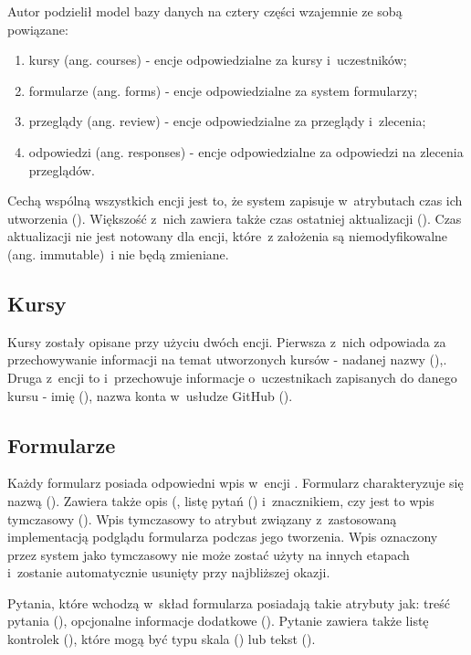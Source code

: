 Autor podzielił model bazy danych na cztery części wzajemnie ze sobą powiązane:
\begin{enumerate}
    \item kursy (ang. courses) - encje odpowiedzialne za kursy i~uczestników;
    \item formularze (ang. forms) - encje odpowiedzialne za system formularzy;
    \item przeglądy (ang. review) - encje odpowiedzialne za przeglądy i~zlecenia;
    \item odpowiedzi (ang. responses) - encje odpowiedzialne za odpowiedzi na zlecenia przeglądów.
\end{enumerate}

\medskip
Cechą wspólną wszystkich encji jest to, że system zapisuje w~atrybutach czas ich utworzenia (). Większość z~nich zawiera także czas ostatniej aktualizacji (). Czas aktualizacji nie jest notowany dla encji, które~z założenia są niemodyfikowalne (ang. immutable)~i nie będą zmieniane.

\subsection{Kursy}
Kursy zostały opisane przy użyciu dwóch encji. Pierwsza z~nich  odpowiada za przechowywanie informacji na temat utworzonych kursów - nadanej nazwy (),. Druga z~encji to  i~przechowuje informacje o~uczestnikach zapisanych do danego kursu - imię (), nazwa konta w~usłudze GitHub ().

\subsection{Formularze}
Każdy formularz posiada odpowiedni wpis w~encji . Formularz charakteryzuje się nazwą (). Zawiera także opis (, listę pytań () i~znacznikiem, czy jest to wpis tymczasowy (). Wpis tymczasowy to atrybut związany z~zastosowaną implementacją podglądu formularza podczas jego tworzenia. Wpis oznaczony przez system jako tymczasowy nie może zostać użyty na innych etapach i~zostanie automatycznie usunięty przy najbliższej okazji.

\medskip
Pytania, które wchodzą w~skład formularza posiadają takie atrybuty jak: treść pytania (), opcjonalne informacje dodatkowe (). Pytanie zawiera także listę kontrolek (), które mogą być typu skala () lub tekst ().


